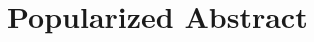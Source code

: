 \chapter{Popularized Abstract}\label{ch:popabstract}

\instructionspopabstract

\makeatletter
{}
\makeatother

\acresetall




\cleardoublepage
